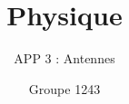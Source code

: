 \documentclass[pdf]{beamer}
\title{Physique}
\subtitle{APP 3 : Antennes}
\author{Groupe 1243}
\begin{document}
 
 
\begin{frame} 
	\titlepage 
 \end{frame} 
 
\end{document}
